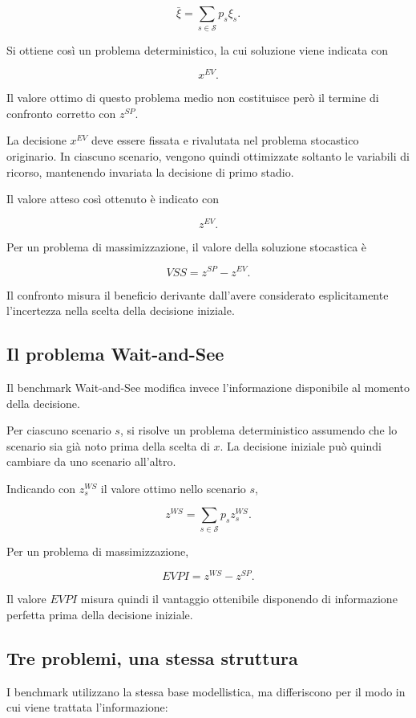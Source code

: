 \[
\bar{\xi}
=
\sum_{s\in\mathcal{S}}
p_s \xi_s.
\]

Si ottiene cos\`i un problema deterministico, la cui soluzione viene indicata
con

\[
x^{EV}.
\]

Il valore ottimo di questo problema medio non costituisce per\`o il termine di
confronto corretto con \(z^{SP}\).

La decisione \(x^{EV}\) deve essere fissata e rivalutata nel problema
stocastico originario. In ciascuno scenario, vengono quindi ottimizzate
soltanto le variabili di ricorso, mantenendo invariata la decisione di primo
stadio.

Il valore atteso cos\`i ottenuto \`e indicato con

\[
z^{EV}.
\]

Per un problema di massimizzazione, il valore della soluzione stocastica \`e

\[
VSS
=
z^{SP}
-
z^{EV}.
\]

Il confronto misura il beneficio derivante dall'avere considerato
esplicitamente l'incertezza nella scelta della decisione iniziale.

\subsection{Il problema Wait-and-See}

Il benchmark Wait-and-See modifica invece l'informazione disponibile al
momento della decisione.

Per ciascuno scenario \(s\), si risolve un problema deterministico assumendo
che lo scenario sia gi\`a noto prima della scelta di \(x\). La decisione
iniziale pu\`o quindi cambiare da uno scenario all'altro.

Indicando con \(z_s^{WS}\) il valore ottimo nello scenario \(s\),

\[
z^{WS}
=
\sum_{s\in\mathcal{S}}
p_s z_s^{WS}.
\]

Per un problema di massimizzazione,

\[
EVPI
=
z^{WS}
-
z^{SP}.
\]

Il valore \(EVPI\) misura quindi il vantaggio ottenibile disponendo di
informazione perfetta prima della decisione iniziale.

\subsection{Tre problemi, una stessa struttura}

I benchmark utilizzano la stessa base modellistica, ma differiscono per il
modo in cui viene trattata l'informazione:

